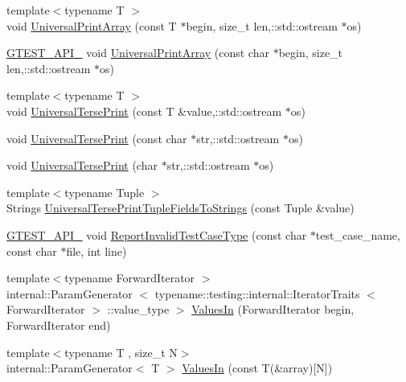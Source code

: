 \begin{DoxyCompactItemize}
\item 
{\footnotesize template$<$typename T $>$ }\\void \hyperlink{namespacetesting_1_1internal_a5a0f5162309823ca1cc9d43607eae2a5}{\-Universal\-Print\-Array} (const \-T $\ast$begin, size\-\_\-t len,\-::std\-::ostream $\ast$os)
\item 
\hyperlink{gtest-port_8h_aa73be6f0ba4a7456180a94904ce17790}{\-G\-T\-E\-S\-T\-\_\-\-A\-P\-I\-\_\-} void \hyperlink{namespacetesting_1_1internal_acb49eae17314fc8f2a6b617fa4205fe6}{\-Universal\-Print\-Array} (const char $\ast$begin, size\-\_\-t len,\-::std\-::ostream $\ast$os)
\item 
{\footnotesize template$<$typename T $>$ }\\void \hyperlink{namespacetesting_1_1internal_ae988148fb759e91d32a2908b3542b25b}{\-Universal\-Terse\-Print} (const \-T \&value,\-::std\-::ostream $\ast$os)
\item 
void \hyperlink{namespacetesting_1_1internal_ae48ed1fb26cf9f2670c340b946cc373b}{\-Universal\-Terse\-Print} (const char $\ast$str,\-::std\-::ostream $\ast$os)
\item 
void \hyperlink{namespacetesting_1_1internal_a3e7d596ecc48aa301ed5e3123a3701fb}{\-Universal\-Terse\-Print} (char $\ast$str,\-::std\-::ostream $\ast$os)
\item 
{\footnotesize template$<$typename Tuple $>$ }\\\-Strings \hyperlink{namespacetesting_1_1internal_a7e60d1478b074801c766eeee9be6c772}{\-Universal\-Terse\-Print\-Tuple\-Fields\-To\-Strings} (const \-Tuple \&value)
\item 
\hyperlink{gtest-port_8h_aa73be6f0ba4a7456180a94904ce17790}{\-G\-T\-E\-S\-T\-\_\-\-A\-P\-I\-\_\-} void \hyperlink{namespacetesting_1_1internal_a864171ad4983f5b8e4258d0d5db0c03b}{\-Report\-Invalid\-Test\-Case\-Type} (const char $\ast$test\-\_\-case\-\_\-name, const char $\ast$file, int line)
\item 
{\footnotesize template$<$typename Forward\-Iterator $>$ }\\internal\-::\-Param\-Generator\*
$<$ typename\-::testing\-::internal\-::\-Iterator\-Traits\*
$<$ \-Forward\-Iterator $>$\*
\-::value\-\_\-type $>$ \hyperlink{namespacetesting_a538dc2f2434b56784a19e073e6c03aae}{\-Values\-In} (\-Forward\-Iterator begin, \-Forward\-Iterator end)
\item 
{\footnotesize template$<$typename T , size\-\_\-t \-N$>$ }\\internal\-::\-Param\-Generator$<$ \-T $>$ \hyperlink{namespacetesting_a18520d1610a411dc6ed84c2e8e3a00a8}{\-Values\-In} (const \-T(\&array)\mbox{[}\-N\mbox{]})

\end{DoxyCompactItemize}
